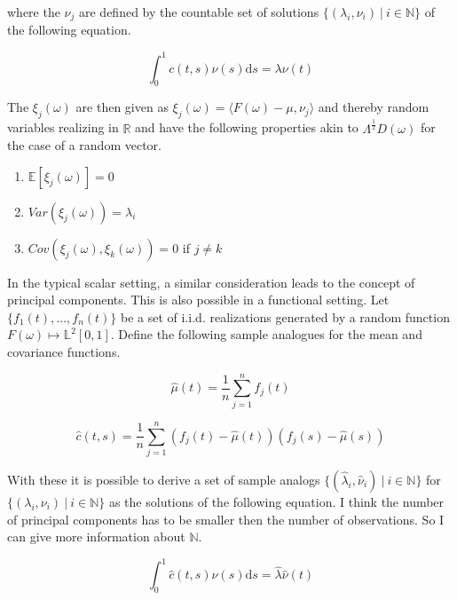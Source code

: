 \documentclass[11pt,twoside,a4paper]{article}
\begin{document}
	where the $\nu_j$ are defined by the countable set of solutions $\{(\lambda_i, \nu_i) \: \vert \: i \in \mathbb{N}\}$ of the following equation.
	
	\begin{equation}
		\int_{0}^{1}c(t,s)\nu(s) \mathrm{d}s = \lambda \nu(t)
	\end{equation}
	
	The $\xi_j(\omega)$ are then given as $\xi_j(\omega) = \langle F(\omega) - \mu, \nu_j\rangle$ and thereby random variables realizing in $\mathbb{R}$ and have the following properties akin to $\Lambda^{\frac{1}{2}} D(\omega)$ for the case of a random vector.
	
	\begin{multicols}{2}
		\begin{enumerate}
			\item $\mathbb{E}\left[\xi_j(\omega)\right] = 0$
			\item $Var\left(\xi_j(\omega)\right) = \lambda_i$
			\item $Cov\left(\xi_j(\omega), \xi_k(\omega)\right) = 0$ if $j \neq k$
		\end{enumerate}
	\end{multicols}
	
	In the typical scalar setting, a similar consideration leads to the concept of principal components. This is also possible in a functional setting. Let $\{f_1(t), \dots, f_n(t)\}$ be a set of i.i.d. realizations generated by a random function $F(\omega) \mapsto \mathbb{L}^2[0,1]$.
	Define the following sample analogues for the mean and covariance functions.
	
	\begin{equation}
		\hat{\mu}(t) = \frac{1}{n}\sum_{j = 1}^{n}f_j(t)
	\end{equation}

	\begin{equation}
		\hat{c}(t,s) = \frac{1}{n} \sum_{j = 1}^{n} \left(f_j(t) - \hat{\mu}(t)\right) \left(f_j(s) - \hat{\mu}(s)\right)
	\end{equation}

	With these it is possible to derive a set of sample analogs $\{(\hat{\lambda}_i, \hat{\nu}_i) \: \vert \: i \in \mathbb{N}\}$ for $\{(\lambda_i, \nu_i) \: \vert \: i \in \mathbb{N}\}$ as the solutions of the following equation. {\color{red} I think the number of principal components has to be smaller then the number of observations. So I can give more information about $\mathbb{N}$.}
	
	\begin{equation}
		\int_{0}^{1}\hat{c}(t,s)\hat{\nu}(s) \mathrm{d}s = \hat{\lambda} \hat{\nu}(t)
	\end{equation}
	
\end{document}
